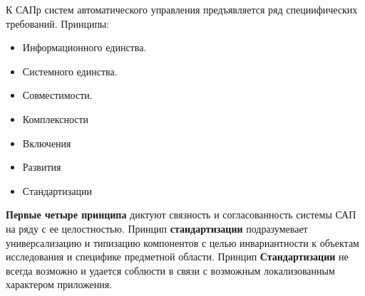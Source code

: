 К САПр систем автоматического управления предъявляется ряд специифических
требований. Принципы:
\begin{itemize}
	\item Информационного единства.
	\item Системного единства.
	\item Совместимости.
	\item Комплексности
	\item Включения
	\item Развития
	\item Стандартизации
\end{itemize}\par
\textbf{Первые четыре принципа} диктуют связность и согласованность системы САП на ряду с ее целостностью. Принцип \textbf{стандартизации} подразумевает 
универсализацию и типизацию компонентов с целью инвариантности к объектам 
исследования и специфике предметной области. Принцип \textbf{Стандартизации} не всегда возможно и удается соблюсти в связи с возможным локализованным характером
приложения.

